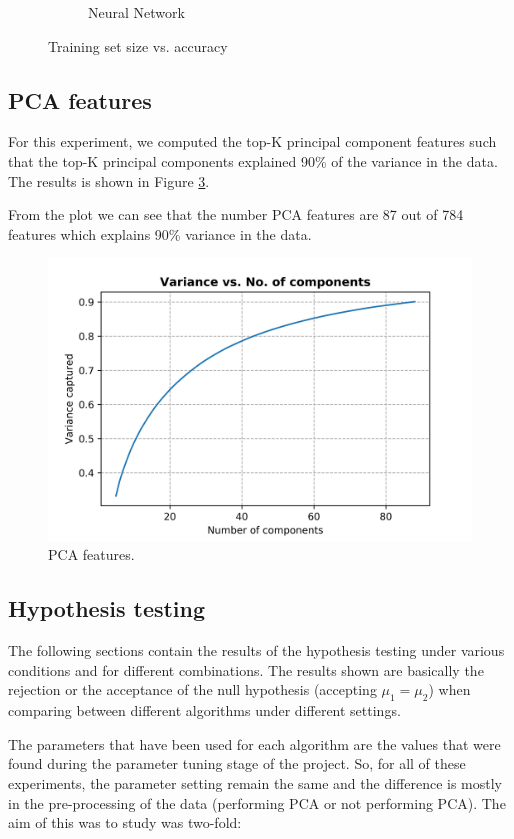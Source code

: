 \documentclass[10pt]{scrartcl}
\begin{document}
\begin{figure}[H]
\begin{subfigure}{0.4\linewidth}
		\caption{Neural Network}\label{fig:1b}
	\end{subfigure}
	\caption{Training set size vs. accuracy}\label{fig:1}
\end{figure}

\subsection*{PCA features}
For this experiment, we computed the top-K principal component features such that the top-K principal components explained 90\% of the variance in the data. 
The results is shown in Figure \ref{fig:pca_features}.

From the plot we can see that the number PCA features are 87 out of 784 features which explains 90\% variance in the data.
\begin{figure}[H]
\centering
\includegraphics[width=0.5\linewidth]{figures/pca_variance_vs_no_comp.png}
\caption{PCA features. \label{fig:pca_features}}
\end{figure}

\subsection*{Hypothesis testing}

The following sections contain the results of the hypothesis testing under various conditions and for different combinations. The results shown are basically the rejection or the acceptance of the null hypothesis (accepting $\mu_{1} = \mu_{2}$) when comparing between different algorithms under different settings.

The parameters that have been used for each algorithm are the values that were found during the parameter tuning stage of the project. So, for all of these experiments, the parameter setting remain the same and the difference is mostly in the pre-processing of the data (performing PCA or not performing PCA). The aim of this was to study was two-fold:
\end{document}
